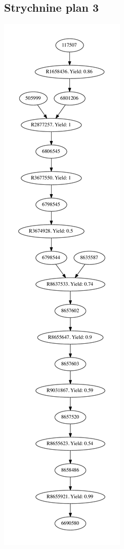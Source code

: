 \documentclass[a4paper,10pt,titlepage]{paper}
\begin{document}
\subsection{Strychnine plan 3}
\centering
\includegraphics[scale=0.4]{Synteseplaner/Strychnine/plan3.pdf}
\label{Appendix::Strychnine3}
\end{document}

